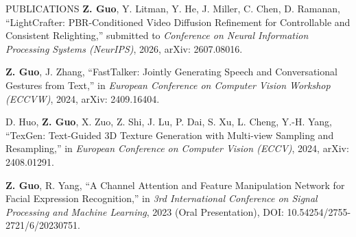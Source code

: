 \documentclass{resume} %
\begin{document}
\begin{rSection}{PUBLICATIONS}
\textbf{Z. Guo}, Y. Litman, Y. He, J. Miller, C. Chen, D. Ramanan, “LightCrafter: PBR-Conditioned Video Diffusion Refinement for Controllable and Consistent Relighting,” submitted to \textit{Conference on Neural Information Processing Systems (NeurIPS)}, 2026, arXiv: 2607.08016.

\textbf{Z. Guo}, J. Zhang, “FastTalker: Jointly Generating Speech and Conversational Gestures from Text,” in \textit{European Conference on Computer Vision Workshop (ECCVW)}, 2024, arXiv: 2409.16404.

D. Huo, \textbf{Z. Guo}, X. Zuo, Z. Shi, J. Lu, P. Dai, S. Xu, L. Cheng, Y.-H. Yang, “TexGen: Text-Guided 3D Texture Generation with Multi-view Sampling and Resampling,” in \textit{European Conference on Computer Vision (ECCV)}, 2024, arXiv: 2408.01291.

\textbf{Z. Guo}, R. Yang, “A Channel Attention and Feature Manipulation Network for Facial Expression Recognition,” in \textit{3rd International Conference on Signal Processing and Machine Learning}, 2023 (Oral Presentation), DOI: 10.54254/2755-2721/6/20230751.

\end{rSection}
\end{document}

